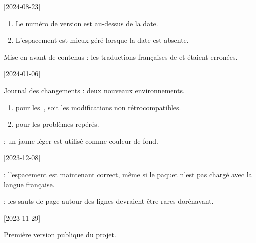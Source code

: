 \tdocsep




[2024-08-23]

\begin{tdocupdate}
    \item {}
    \begin{enumerate}
        \item Le numéro de version est au-dessus de la date.

        \item L'espacement est mieux géré lorsque la date est absente.
    \end{enumerate}
\end{tdocupdate}


\begin{tdocfix}
    \item Mise en avant de contenus : les traductions françaises de  et  étaient erronées.
\end{tdocfix}

\tdocsep




[2024-01-06]

\begin{tdocnew}
    \item Journal des changements : deux nouveaux environnements.
    \begin{enumerate}
        \item {} pour les \,, soit les modifications non rétrocompatibles.

        \item {} pour les problèmes repérés.
    \end{enumerate}

    \item {}: un jaune léger est utilisé comme couleur de fond.
\end{tdocnew}

\tdocsep




[2023-12-08]

\begin{tdocfix}
    \item {}: l'espacement est maintenant correct, même si le paquet  n'est pas chargé avec la langue française.

    \item {}: les sauts de page autour des lignes  devraient être rares dorénavant.
\end{tdocfix}

\tdocsep




[2023-11-29]

Première version publique du projet.


